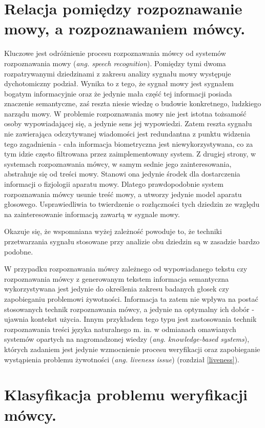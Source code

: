 \section{Relacja pomiędzy rozpoznawanie mowy, a rozpoznawaniem mówcy.}
Kluczowe jest odróżnienie procesu rozpoznawania mówcy od systemów rozpoznawania mowy (\textit{ang. speech recognition}). Pomiędzy tymi dwoma rozpatrywanymi dziedzinami z zakresu analizy sygnału mowy występuje dychotomiczny podział. Wynika to z tego, że sygnał mowy jest sygnałem bogatym informacyjnie oraz że jedynie mała część tej informacji posiada znaczenie semantyczne, zaś reszta niesie wiedzę o budowie konkretnego, ludzkiego narządu mowy. W problemie rozpoznawania mowy nie jest istotna tożsamość osoby wypowiadającej się, a jedynie sens jej wypowiedzi. Zatem reszta sygnału nie zawierająca odczytywanej wiadomości jest redundantna z punktu widzenia tego zagadnienia - cała informacja biometryczna jest niewykorzystywana, co za tym idzie często filtrowana przez zaimplementowany system. Z drugiej strony, w systemach rozpoznawania mówcy, w samym sednie jego zainteresowania, abstrahuje się od treści mowy. Stanowi ona jedynie środek dla dostarczenia informacji o fizjologii aparatu mowy. Dlatego prawdopodobnie system rozpoznawania mówcy usunie treść mowy, a utworzy jedynie model aparatu głosowego. Usprawiedliwia to twierdzenie o rozłączności tych dziedzin ze względu na zainteresowanie informacją zawartą w sygnale mowy. 

Okazuje się, że wspomniana wyżej zależność powoduje to, że techniki przetwarzania sygnału stosowane przy analizie obu dziedzin są w zasadzie bardzo podobne. 

W przypadku rozpoznawania mówcy zależnego od wypowiadanego tekstu czy rozpoznawania mówcy z generowanym tekstem informacja semantyczna wykorzystywana jest jedynie do określenia zakresu badanych głosek czy zapobieganiu problemowi żywotności. Informacja ta zatem nie wpływa na postać stosowanych technik rozpoznawania mówcy, a jedynie na optymalny ich dobór - ujawnia kontekst użycia. Innym przykładem tego typu jest zastosowania technik rozpoznawania treści języka naturalnego m. in. w odmianach omawianych systemów opartych na nagromadzonej wiedzy (\textit{ang. knowledge-based systems}), których zadaniem jest jedynie wzmocnienie procesu weryfikacji oraz zapobieganie wystąpienia problemu żywotności (\textit{ang. liveness issue}) (rozdział \ref{liveness}). 

\section{Klasyfikacja problemu weryfikacji mówcy.}
